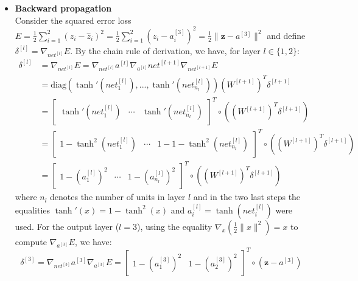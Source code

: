 \documentclass{exam}
\begin{document}
\begin{questions}
\begin{itemize}
            \item \textbf{Backward propagation} \\
            Consider the squared error loss $E = \frac{1}{2}\sum_{i = 1}^{2} (z_i - \hat{z}_i)^2 = \frac{1}{2}\sum_{i = 1}^{2} \left(z_i - a_i^{[3]}\right)^2 =  \frac{1}{2}\| \mathbf{z} - a^{[3]}\|^2$ and define $\delta^{[l]} = \nabla_{net^{[l]}} E$. By the chain rule of derivation, we have, for layer $l \in \{1, 2\}$:
            \begin{align}
                \delta^{[l]}& = \nabla_{net^{[l]}} E = \nabla_{net^{[l]}} a^{[l]} \nabla_{a^{[l]}} net^{[l+1]} \nabla_{net^{[l+1]}} E  \nonumber \\
                &= \text{diag}(\tanh'(net^{[l]}_1), ..., \tanh'(net^{[l]}_{n_l}))(W^{[l + 1]})^T\delta^{[l + 1]} \nonumber \\
                &= 
                \begin{bmatrix}
                    \tanh'(net^{[l]}_1) & \cdots & \tanh'(net^{[l]}_{n_l})
                \end{bmatrix}^T \circ \left((W^{[l + 1]})^T\delta^{[l + 1]}\right) \nonumber \\
                &= \begin{bmatrix}
                    1 - \tanh^2(net^{[l]}_1) & \cdots &  1 - 1 - \tanh^2(net^{[l]}_{n_l})
                \end{bmatrix}^T \circ \left((W^{[l + 1]})^T\delta^{[l + 1]}\right) \nonumber \\
                &= \begin{bmatrix}
                    1 - (a^{[l]}_1)^2 & \cdots &  1 - (a^{[l]}_{n_l})^2
                \end{bmatrix}^T \circ \left((W^{[l + 1]})^T\delta^{[l + 1]}\right) \label{eq:1}
            \end{align}
            where $n_l$ denotes the number of units in layer $l$ and in the two last steps the equalities $\tanh'(x) = 1 - \tanh^2(x)$ and $a^{[l]}_i = \tanh(net^{[l]}_i)$ were used. For the output layer ($l = 3$), using the equality $\nabla_x \left(\frac{1}{2}\|x\|^2\right) = x$ to compute $\nabla_{a^{[3]}}{E}$, we have:
            \vspace{-0.5em}
            \begin{equation}
                \delta^{[3]} = \nabla_{net^{[3]}}{a^{[3]}} \nabla_{a^{[3]}}{E} = 
                \begin{bmatrix}
                    1 - (a^{[3]}_1)^2 &   1 - (a^{[3]}_{2})^2
                \end{bmatrix}^T \circ (\mathbf{z} - a^{[3]})

\end{equation}
\end{itemize}
\end{questions}
\end{document}
